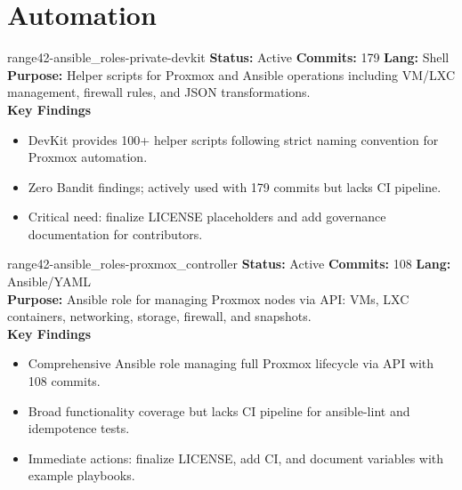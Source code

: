 \documentclass[aspectratio=169]{beamer}
\begin{document}
\section{Automation}

\begin{frame}{range42-ansible\_roles-private-devkit \; \faTerminal}
  \textbf{Status:} Active \hfill \textbf{Commits:} 179 \hfill \textbf{Lang:} Shell\\[2mm]
  \textbf{Purpose:} Helper scripts for Proxmox and Ansible operations including VM/LXC management, firewall rules, and JSON transformations.\\[2mm]
  \textbf{Key Findings}
  \begin{itemize}
    \item DevKit provides 100+ helper scripts following strict naming convention for Proxmox automation.
    \item Zero Bandit findings; actively used with 179 commits but lacks CI pipeline.
    \item Critical need: finalize LICENSE placeholders and add governance documentation for contributors.
  \end{itemize}
\end{frame}

\begin{frame}{range42-ansible\_roles-proxmox\_controller \; \faCogs}
  \textbf{Status:} Active \hfill \textbf{Commits:} 108 \hfill \textbf{Lang:} Ansible/YAML\\[2mm]
  \textbf{Purpose:} Ansible role for managing Proxmox nodes via API: VMs, LXC containers, networking, storage, firewall, and snapshots.\\[2mm]
  \textbf{Key Findings}
  \begin{itemize}
    \item Comprehensive Ansible role managing full Proxmox lifecycle via API with 108 commits.
    \item Broad functionality coverage but lacks CI pipeline for ansible-lint and idempotence tests.
    \item Immediate actions: finalize LICENSE, add CI, and document variables with example playbooks.
  \end{itemize}
\end{frame}
\end{document}

